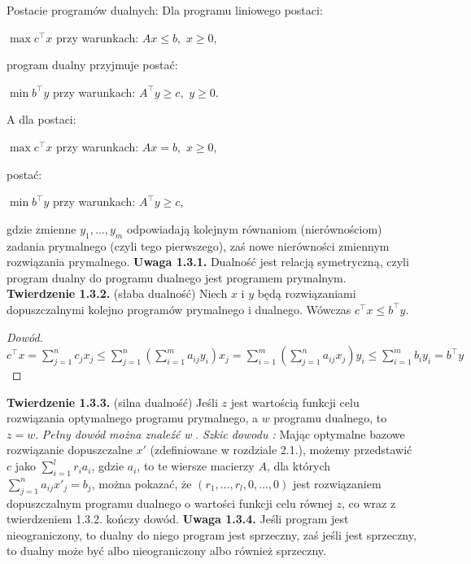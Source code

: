 \documentclass[licencjacka]{pracamgr}
\begin{document}
Postacie programów dualnych:\newline
%
Dla programu liniowego postaci:\newline
\centerline{$\max c^{\top}x$ przy warunkach: $Ax\le b,$ $x\ge0$,}\newline
program dualny przyjmuje postać:\newline
\centerline{$\min b^{\top}y$ przy warunkach: $A^{\top}y\ge c,$ $y\ge0$.}\newline
A dla postaci:\newline
\centerline{$\max c^{\top}x$ przy warunkach: $Ax=b,$ $x\ge0$,}\newline
postać:\newline
\centerline{$\min b^{\top}y$ przy warunkach: $A^{\top}y\ge c$,}\newline\newline
gdzie zmienne $y_1,...,y_m$ odpowiadają kolejnym równaniom (nierównościom) zadania prymalnego (czyli tego pierwszego), zaś nowe nierówności zmiennym rozwiązania prymalnego.\newline\newline
%
\textbf{Uwaga 1.3.1.} Dualność jest relacją symetryczną, czyli program dualny do programu dualnego jest programem prymalnym.\newline\newline
%
\textbf{Twierdzenie 1.3.2.} (słaba dualność) Niech $x$ i $y$ będą rozwiązaniami dopuszczalnymi kolejno programów prymalnego i dualnego. Wówczas $c^{\top}x\le b^{\top}y$.
\begin{proof}[Dowód]
$c^{\top}x=\sum\limits_{j=1}^{n}c_jx_j\le\sum\limits_{j=1}^{n}(\sum\limits_{i=1}^{m}a_{ij}y_i)x_j=
\sum\limits_{i=1}^{m}(\sum\limits_{j=1}^{n}a_{ij}x_j)y_i\le\sum\limits_{i=1}^{m}b_iy_i=b^{\top}y$
\end{proof}
\noindent
\textbf{Twierdzenie 1.3.3.} (silna dualność) Jeśli $z$ jest wartością funkcji celu rozwiązania optymalnego programu prymalnego, a $w$ programu dualnego, to $z=w$.\newline\newline
\textit{Pełny dowód można znaleźć w} \cite[tw. 8.3]{OPT}.\newline
\textit{Szkic dowodu : } Mając optymalne bazowe rozwiązanie dopuszczalne $x'$ (zdefiniowane w rozdziale 2.1.), możemy przedstawić $c$ jako $\sum\limits_{i=1}^{l}r_ia_i$, 
gdzie $a_i$, to te wiersze macierzy $A$, dla których $\sum\limits_{j=1}^{n}a_{ij}x'_j=b_j$, można pokazać, że $(r_1,...,r_l,0,...,0)$ jest rozwiązaniem dopuszczalnym programu dualnego
o wartości funkcji celu równej $z$, co wraz z twierdzeniem 1.3.2. kończy dowód.\newline\newline
\textbf{Uwaga 1.3.4.} Jeśli program jest nieograniczony, to dualny do niego program jest sprzeczny,
zaś jeśli jest sprzeczny, to dualny może być albo nieograniczony albo również sprzeczny.
%
\end{document}
